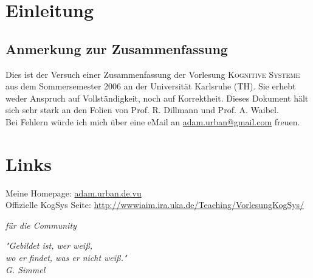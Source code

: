 
\section*{Einleitung}

\subsection*{Anmerkung zur Zusammenfassung}

Dies ist der Versuch einer Zusammenfassung der Vorlesung \textsc{Kognitive Systeme} aus dem Sommersemester 2006 an der Universität Karlsruhe (TH). Sie erhebt weder Anspruch auf Vollständigkeit, noch auf Korrektheit. Dieses Dokument hält sich sehr stark an den Folien von Prof. R. Dillmann und Prof. A. Waibel. \\
Bei Fehlern würde ich mich über eine eMail an \href{mailto:adam.urban@gmail.com}{adam.urban@gmail.com} freuen.

\section*{Links}

Meine Homepage: \hfill \href{http://adam.urban.de.vu/}{adam.urban.de.vu} \\[0,2cm]
Offizielle KogSys Seite: \hfill \href{http://wwwiaim.ira.uka.de/Teaching/VorlesungKogSys/}{http://wwwiaim.ira.uka.de/Teaching/VorlesungKogSys/}

\cleardoublepage

\pagestyle{empty}

\begin{flushright}
\textsl{für die Community}
\end{flushright}


\vspace{8cm}

\begin{center}
\textsl{"{}Gebildet ist, wer weiß, \\ wo er findet, was er nicht weiß."{} \\[0,5cm] \qquad \qquad \qquad \qquad G. Simmel}
\end{center}
